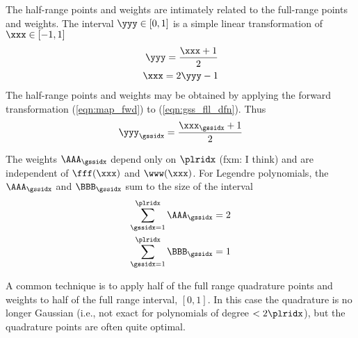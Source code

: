 \documentclass[12pt]{article}
\begin{document}
The half-range points and weights are intimately related to the
full-range points and weights.
The interval $\yyy \in [0,1]$ is a simple linear transformation
of $\xxx \in [-1,1]$
\begin{eqnarray}
\label{eqn:map_fwd}
\yyy = \frac{\xxx + 1}{2} \\
\label{eqn:map_rvr}
\xxx = 2\yyy - 1 
\end{eqnarray}
The half-range points and weights may be obtained by applying the
forward transformation (\ref{eqn:map_fwd}) to
(\ref{eqn:gss_fll_dfn}). 
Thus
\begin{equation}
\yyy_{\gssidx} = \frac{\xxx_{\gssidx} + 1}{2}
\label{eqn:pnt_map}
\end{equation}

The weights $\AAA_{\gssidx}$ depend only on $\plridx$ (fxm: I think) and are
independent of $\fff(\xxx)$ and $\www(\xxx)$. 
For Legendre polynomials, the $\AAA_{\gssidx}$ and $\BBB_{\gssidx}$ sum to the size of
the interval
\begin{eqnarray}
\label{eqn:fll_wgt_dfn}
\sum_{\gssidx = 1}^{\plridx} \AAA_{\gssidx} = 2 \\
\label{eqn:hlf_wgt_dfn}
\sum_{\gssidx = 1}^{\plridx} \BBB_{\gssidx} = 1
\end{eqnarray}

A common technique is to apply half of the full range quadrature 
points and weights to half of the full range interval, $[0,1]$.
In this case the quadrature is no longer Gaussian (i.e., not exact for 
polynomials of degree $< 2\plridx$), but the quadrature points are
often quite optimal.
\end{document}

